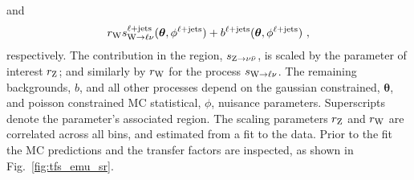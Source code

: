 %
and
%
\begin{equation}\label{eq:ellplusjets-expectation}
    r_{\PW}s_{\IWlv}^{\ellplusjets}(\bm{\theta},\phi^{\ellplusjets})%
    + b^{\ellplusjets}(\bm{\theta},\phi^{\ellplusjets})\ ,
\end{equation}
%
respectively. The \IZvv contribution in the \metplusjets region, $s_{{\mathrm{Z}\rightarrow\nu\bar{\nu}}}$, is scaled by the parameter of interest $r_{\mathrm{Z}}$; and similarly by $r_{\mathrm{W}}$ for the \IWlv process $s_{{\mathrm{W}\rightarrow \ell\nu}}$. The remaining backgrounds, $b$, and all other processes depend on the gaussian constrained, $\bm{\theta}$, and poisson constrained MC statistical, $\phi$, nuisance parameters. Superscripts denote the parameter's associated region. The scaling parameters $r_\mathrm{Z}$ and $r_\mathrm{W}$ are correlated across all \recoil bins, and estimated from a fit to the data. Prior to the fit the MC predictions and the transfer factors are inspected, as shown in Fig.~\ref{fig:tfs_emu_sr}.

